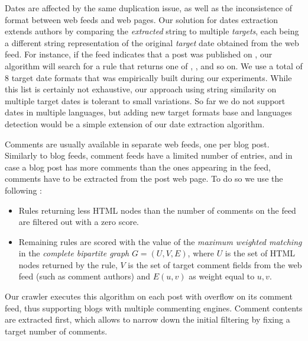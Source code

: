 Dates are affected by the same duplication issue, as well as the inconsistence of format between web feeds and web pages. Our solution for dates extraction extends authors  by comparing the \emph{extracted} string to multiple \emph{targets}, each being a different string representation of the original \emph{target} date obtained from the web feed. For instance, if the feed indicates that a post was published on , our algorithm will search for a rule that returns one of , ,  and so on. We use a total of 8 target date formats that was empirically built during our experiments. While this list is certainly not exhaustive, our approach using string similarity on multiple target dates is tolerant to small variations. So far we do not support dates in multiple languages, but adding new target formats base and languages detection would be a simple extension of our date extraction algorithm.

Comments are usually available in separate web feeds, one per blog post. Similarly to blog feeds, comment feeds have a limited number of entries, and in case a blog post has more comments than the ones appearing in the feed, comments have to be extracted from the post web page. To do so we use the following :
\begin{itemize}
  \item Rules returning less HTML nodes than the number of comments on the feed are filtered out with a zero score.
  \item Remaining rules are scored with the value of the \emph{maximum weighted matching} in the \emph{complete bipartite graph} $G = (U, V, E)$, where $U$ is the set of HTML nodes returned by the rule, $V$ is the set of target comment fields from the web feed (such as comment authors) and $E(u, v)$ as weight equal to \code{\ref{similarityAlgo}(}$u, v$\code{)}.
\end{itemize}
Our crawler executes this algorithm on each post with overflow on its comment feed, thus supporting blogs with multiple commenting engines. Comment contents are extracted first, which allows to narrow down the initial filtering by fixing a target number of comments.

